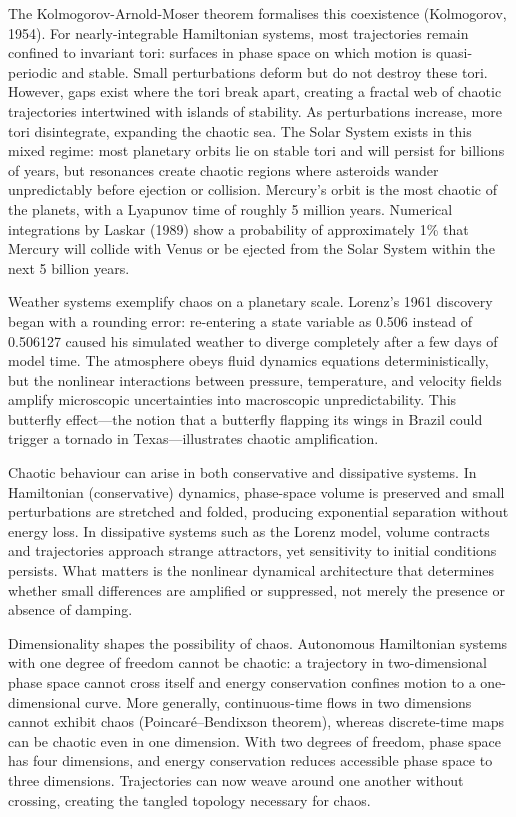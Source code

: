 The Kolmogorov-Arnold-Moser theorem formalises this coexistence (Kolmogorov, 1954). For nearly-integrable Hamiltonian systems, most trajectories remain confined to invariant tori: surfaces in phase space on which motion is quasi-periodic and stable. Small perturbations deform but do not destroy these tori. However, gaps exist where the tori break apart, creating a fractal web of chaotic trajectories intertwined with islands of stability. As perturbations increase, more tori disintegrate, expanding the chaotic sea. The Solar System exists in this mixed regime: most planetary orbits lie on stable tori and will persist for billions of years, but resonances create chaotic regions where asteroids wander unpredictably before ejection or collision. Mercury's orbit is the most chaotic of the planets, with a Lyapunov time of roughly 5 million years. Numerical integrations by Laskar (1989) show a probability of approximately 1\% that Mercury will collide with Venus or be ejected from the Solar System within the next 5 billion years.

Weather systems exemplify chaos on a planetary scale. Lorenz's 1961 discovery began with a rounding error: re-entering a state variable as 0.506 instead of 0.506127 caused his simulated weather to diverge completely after a few days of model time. The atmosphere obeys fluid dynamics equations deterministically, but the nonlinear interactions between pressure, temperature, and velocity fields amplify microscopic uncertainties into macroscopic unpredictability. This \QSOpen{}butterfly effect\QSClose{}—the notion that a butterfly flapping its wings in Brazil could trigger a tornado in Texas—illustrates chaotic amplification.

Chaotic behaviour can arise in both conservative and dissipative systems. In Hamiltonian (conservative) dynamics, phase-space volume is preserved and small perturbations are stretched and folded, producing exponential separation without energy loss. In dissipative systems such as the Lorenz model, volume contracts and trajectories approach strange attractors, yet sensitivity to initial conditions persists. What matters is the nonlinear dynamical architecture that determines whether small differences are amplified or suppressed, not merely the presence or absence of damping.

Dimensionality shapes the possibility of chaos. Autonomous Hamiltonian systems with one degree of freedom cannot be chaotic: a trajectory in two-dimensional phase space cannot cross itself and energy conservation confines motion to a one-dimensional curve. More generally, continuous-time flows in two dimensions cannot exhibit chaos (Poincaré–Bendixson theorem), whereas discrete-time maps can be chaotic even in one dimension. With two degrees of freedom, phase space has four dimensions, and energy conservation reduces accessible phase space to three dimensions. Trajectories can now weave around one another without crossing, creating the tangled topology necessary for chaos.


